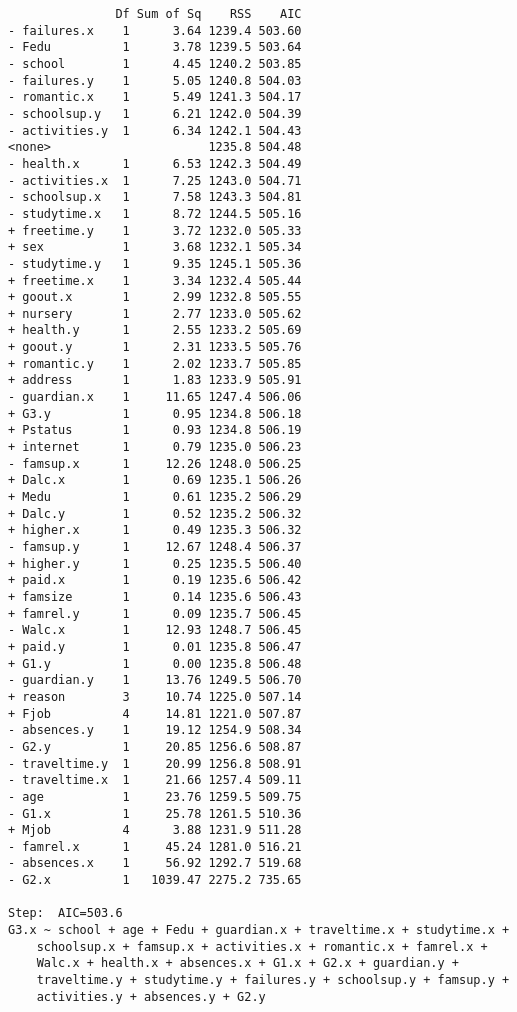 \documentclass[11pt]{article}
\begin{document}
\begin{enumerate}
\begin{verbatim}
               Df Sum of Sq    RSS    AIC
- failures.x    1      3.64 1239.4 503.60
- Fedu          1      3.78 1239.5 503.64
- school        1      4.45 1240.2 503.85
- failures.y    1      5.05 1240.8 504.03
- romantic.x    1      5.49 1241.3 504.17
- schoolsup.y   1      6.21 1242.0 504.39
- activities.y  1      6.34 1242.1 504.43
<none>                      1235.8 504.48
- health.x      1      6.53 1242.3 504.49
- activities.x  1      7.25 1243.0 504.71
- schoolsup.x   1      7.58 1243.3 504.81
- studytime.x   1      8.72 1244.5 505.16
+ freetime.y    1      3.72 1232.0 505.33
+ sex           1      3.68 1232.1 505.34
- studytime.y   1      9.35 1245.1 505.36
+ freetime.x    1      3.34 1232.4 505.44
+ goout.x       1      2.99 1232.8 505.55
+ nursery       1      2.77 1233.0 505.62
+ health.y      1      2.55 1233.2 505.69
+ goout.y       1      2.31 1233.5 505.76
+ romantic.y    1      2.02 1233.7 505.85
+ address       1      1.83 1233.9 505.91
- guardian.x    1     11.65 1247.4 506.06
+ G3.y          1      0.95 1234.8 506.18
+ Pstatus       1      0.93 1234.8 506.19
+ internet      1      0.79 1235.0 506.23
- famsup.x      1     12.26 1248.0 506.25
+ Dalc.x        1      0.69 1235.1 506.26
+ Medu          1      0.61 1235.2 506.29
+ Dalc.y        1      0.52 1235.2 506.32
+ higher.x      1      0.49 1235.3 506.32
- famsup.y      1     12.67 1248.4 506.37
+ higher.y      1      0.25 1235.5 506.40
+ paid.x        1      0.19 1235.6 506.42
+ famsize       1      0.14 1235.6 506.43
+ famrel.y      1      0.09 1235.7 506.45
- Walc.x        1     12.93 1248.7 506.45
+ paid.y        1      0.01 1235.8 506.47
+ G1.y          1      0.00 1235.8 506.48
- guardian.y    1     13.76 1249.5 506.70
+ reason        3     10.74 1225.0 507.14
+ Fjob          4     14.81 1221.0 507.87
- absences.y    1     19.12 1254.9 508.34
- G2.y          1     20.85 1256.6 508.87
- traveltime.y  1     20.99 1256.8 508.91
- traveltime.x  1     21.66 1257.4 509.11
- age           1     23.76 1259.5 509.75
- G1.x          1     25.78 1261.5 510.36
+ Mjob          4      3.88 1231.9 511.28
- famrel.x      1     45.24 1281.0 516.21
- absences.x    1     56.92 1292.7 519.68
- G2.x          1   1039.47 2275.2 735.65

Step:  AIC=503.6
G3.x ~ school + age + Fedu + guardian.x + traveltime.x + studytime.x + 
    schoolsup.x + famsup.x + activities.x + romantic.x + famrel.x + 
    Walc.x + health.x + absences.x + G1.x + G2.x + guardian.y + 
    traveltime.y + studytime.y + failures.y + schoolsup.y + famsup.y + 
    activities.y + absences.y + G2.y


\end{verbatim}
\end{enumerate}
\end{document}
